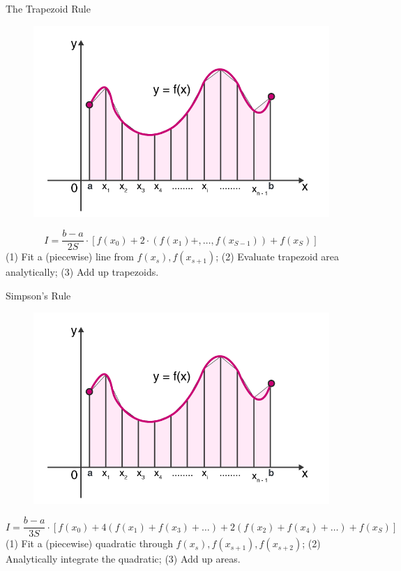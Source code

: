 \documentclass[xcolor=pdftex,dvipsnames,table,mathserif,aspectratio=169]{beamer}
\begin{document}
\begin{frame}{The Trapezoid Rule}
\begin{figure}[htbp]
\begin{center}
\includegraphics[height=0.65\textheight]{./resources/trapezoid.png}
\end{center}
\end{figure}
$$ I = \frac{b-a}{2 S} \cdot \left[f(x_0) + 2\cdot(f(x_1)+,\ldots,f(x_{S-1})) +  f(x_S) \right] $$
(1) Fit a (piecewise) line from $f(x_s),f(x_{s+1})$; (2) Evaluate trapezoid area analytically; (3) Add up trapezoids.
\end{frame}

\begin{frame}{Simpson's Rule}
\begin{figure}[htbp]
\begin{center}
\includegraphics[height=0.65\textheight]{./resources/trapezoid.png}
\end{center}
\end{figure}
$$ I = \frac{b-a}{3S} \cdot \left[f(x_0) + 4(f(x_1)+ f(x_3) +\ldots) + 2(f(x_2)+ f(x_4)+\ldots )  +  f(x_S) \right] $$
(1) Fit a (piecewise) quadratic through $f(x_s),f(x_{s+1}),f(x_{s+2})$; (2) Analytically integrate the quadratic; (3) Add up areas.
\end{frame}
\end{document}
